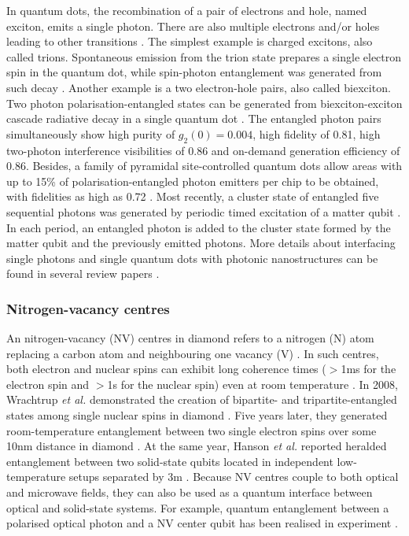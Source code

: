 \documentclass[aps,rmp,twocolumn,amsmath,amssymb,nofootinbib,superscriptaddress,longbibliography,floatfix,table-of-contents,eqsecnum]{revtex4-1}
\begin{document}
In quantum dots, the recombination of a pair of electrons and hole, named exciton, emits a single photon. There are also multiple electrons and/or holes leading to other transitions \cite{lodahl2015interfacing}. The simplest example is charged excitons, also called trions. Spontaneous emission from the trion state prepares a single electron spin in the quantum dot, while spin-photon entanglement was generated from such decay \cite{de2012quantum, gao2012observation}. Another example is a two electron-hole pairs, also called biexciton. Two photon polarisation-entangled states can be generated from biexciton-exciton cascade radiative decay in a single quantum dot \cite{muller2014demand}. The entangled photon pairs simultaneously show high purity of \mbox{$g_2(0) = 0.004$}, high fidelity of 0.81, high two-photon interference visibilities of 0.86 and on-demand generation efficiency of 0.86. Besides, a family of pyramidal site-controlled quantum dots allow areas with up to 15\% of polarisation-entangled photon emitters per chip to be obtained, with fidelities as high as 0.72 \cite{juska2013towards, mohan2010polarization}. Most recently, a cluster state of entangled five sequential photons was generated by periodic timed excitation of a matter qubit \cite{schwartz2016deterministic}. In each period, an entangled photon is added to the cluster state formed by the matter qubit and the previously emitted photons. More details about interfacing single photons and single quantum dots with photonic nanostructures can be found in several review papers \cite{de2013ultrafast, urbaszek2013nuclear, lodahl2015interfacing}.

%
%

\subsubsection{Nitrogen-vacancy centres} 

An nitrogen-vacancy (NV) centres in diamond refers to a nitrogen (N) atom replacing a carbon atom and neighbouring one vacancy (V) \cite{doherty2013nitrogen}. In such centres, both electron and nuclear spins can exhibit long coherence times ($>$1ms for the electron spin and $>$1s for the nuclear spin) even at room temperature \cite{balasubramanian2009ultralong, neumann2010quantum, maurer2012room}. In 2008, Wrachtrup \textit{et al.} demonstrated the creation of bipartite- and tripartite-entangled states among single nuclear spins in diamond \cite{neumann2008multipartite}. Five years later, they generated room-temperature entanglement between two single electron spins over some 10nm distance in diamond \cite{dolde2013room}. At the same year, Hanson \textit{et al.} reported heralded entanglement between two solid-state qubits located in independent low-temperature setups separated by 3m \cite{bernien2013heralded}. Because NV centres couple to both optical and microwave fields, they can also be used as a quantum interface between optical and solid-state systems. For example, quantum entanglement between a polarised optical photon and a NV center qubit has been realised in experiment \cite{togan2010quantum}.
\end{document}
